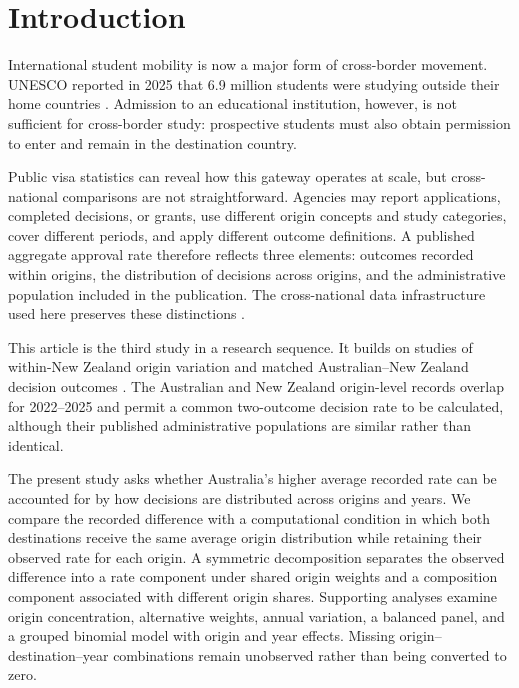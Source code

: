\documentclass[runningheads]{llncs}
\begin{document}
\section{Introduction}

International student mobility is now a major form of cross-border movement. UNESCO reported in 2025 that 6.9 million students were studying outside their home countries \cite{UNESCO2025}. Admission to an educational institution, however, is not sufficient for cross-border study: prospective students must also obtain permission to enter and remain in the destination country.

Public visa statistics can reveal how this gateway operates at scale, but cross-national comparisons are not straightforward. Agencies may report applications, completed decisions, or grants, use different origin concepts and study categories, cover different periods, and apply different outcome definitions. A published aggregate approval rate therefore reflects three elements: outcomes recorded within origins, the distribution of decisions across origins, and the administrative population included in the publication. The cross-national data infrastructure used here preserves these distinctions \cite{Kaplan2026CrossNationalDataPaper,Kaplan2026CountryToVisaDataset}.

This article is the third study in a research sequence. It builds on studies of within-New Zealand origin variation and matched Australian--New Zealand decision outcomes \cite{Kaplan2026NZVisaApproval,Kaplan2026AUNZDecisionOutcomes}. The Australian and New Zealand origin-level records overlap for 2022--2025 and permit a common two-outcome decision rate to be calculated, although their published administrative populations are similar rather than identical.

The present study asks whether Australia's higher average recorded rate can be accounted for by how decisions are distributed across origins and years. We compare the recorded difference with a computational condition in which both destinations receive the same average origin distribution while retaining their observed rate for each origin. A symmetric decomposition separates the observed difference into a rate component under shared origin weights and a composition component associated with different origin shares. Supporting analyses examine origin concentration, alternative weights, annual variation, a balanced panel, and a grouped binomial model with origin and year effects. Missing origin--destination--year combinations remain unobserved rather than being converted to zero.
\end{document}
